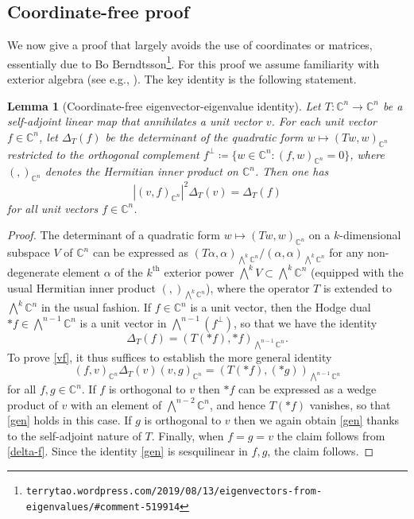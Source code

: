 \documentclass{amsart}
\newcommand\C{\mathbb{C}}
\newtheorem{lemma}{Lemma}
\begin{document}
\subsection{Coordinate-free proof}\label{cfree-sec}

We now give a proof that largely avoids the use of coordinates or matrices, essentially due to Bo Berndtsson\footnote{\tt terrytao.wordpress.com/2019/08/13/eigenvectors-from-eigenvalues/\#comment-519914}.  For this proof we assume familiarity with exterior algebra (see e.g., \cite[Chapter XVI]{BM}).  The key identity is the following statement.

\begin{lemma}[Coordinate-free eigenvector-eigenvalue identity]\label{cfeei}  Let $T: \C^n \to \C^n$ be a self-adjoint linear map that annihilates a unit vector $v$.  For each unit vector $f \in \C^n$, let $\Delta_T(f)$ be the determinant of the quadratic form $w \mapsto (Tw, w)_{\C^n}$ restricted to the orthogonal complement $f^\perp \coloneqq \{ w \in \C^n: (f,w)_{\C^n} = 0 \}$, where $(,)_{\C^n}$ denotes the Hermitian inner product on $\C^n$.  Then one has
\begin{equation}\label{vf}
 |(v,f)_{\C^n}|^2 \Delta_T(v) = \Delta_T(f)
\end{equation}
for all unit vectors $f \in \C^n$.
\end{lemma}

\begin{proof} The determinant of a quadratic form $w \mapsto (Tw,w)_{\C^n}$ on a $k$-dimensional subspace $V$ of $\C^n$ can be expressed as $(T \alpha, \alpha)_{\bigwedge^k \C^n} / (\alpha, \alpha)_{\bigwedge^k \C^n}$ for any non-degenerate element $\alpha$ of the $k^{\mathrm{th}}$ exterior power $\bigwedge^k V \subset \bigwedge^k \C^n$ (equipped with the usual Hermitian inner product $(,)_{\bigwedge^k \C^n}$), where the operator $T$ is extended to $\bigwedge^k \C^n$ in the usual fashion.  If $f \in \C^n$ is a unit vector, then the Hodge dual $*f \in \bigwedge^{n-1} \C^n$ is a unit vector in $\bigwedge^{n-1} (f^\perp)$, so that we have the identity
\begin{equation}\label{delta-f}
 \Delta_T(f) = (T(*f), *f)_{\bigwedge^{n-1}\C^n}.
\end{equation}
To prove \eqref{vf}, it thus suffices to establish the more general identity
\begin{equation}\label{gen}
 (f,v)_{\C^n} \Delta_T(v) (v,g)_{\C^n} = (T(*f), (*g))_{\bigwedge^{n-1}\C^n}
\end{equation}
for all $f,g \in \C^n$.  If $f$ is orthogonal to $v$ then $*f$ can be expressed as a wedge product of $v$ with an element of $\bigwedge^{n-2}\C^n$, and hence $T(*f)$ vanishes, so that \eqref{gen} holds in this case.  If $g$ is orthogonal to $v$ then we again obtain \eqref{gen} thanks to the self-adjoint nature of $T$.  Finally, when $f=g=v$ the claim follows from \eqref{delta-f}.  Since the identity \eqref{gen} is sesquilinear in $f,g$, the claim follows.
\end{proof}
\end{document}
